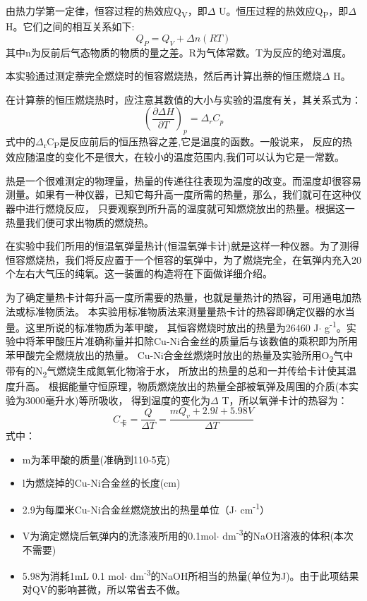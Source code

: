\documentclass[11pt]{report}
\begin{document}
由热力学第一定律，恒容过程的热效应Q\textsubscript{V}，即\(\Delta\) U。恒压过程的热效应Q\textsubscript{P}，即\(\Delta\) H。它们之间的相互关系如下:
\[
    Q_{P}=Q_{V}+\Delta n(RT)
    \]
其中n为反前后气态物质的物质的量之差。R为气体常数。T为反应的绝对温度。

本实验通过测定萘完全燃烧时的恒容燃烧热，然后再计算出萘的恒压燃烧\(\Delta\) H。

在计算萘的恒压燃烧热时，应注意其数值的大小与实验的温度有关，其关系式为：
\[
    \left(\frac{\partial \Delta H}{\partial T}\right)_{p}=\Delta_{r}C_{p}
    \]
式中的\(\Delta\)\textsubscript{r}C\textsubscript{P}是反应前后的恒压热容之差,它是温度的函数。一般说来，
反应的热效应随温度的变化不是很大，在较小的温度范围内,我们可以认为它是一常数。

热是一个很难测定的物理量，热量的传递往往表现为温度的改变。而温度却很容易测量。如果有一种仪器，已知它每升高一度所需的热量，那么，我们就可在这种仪器中进行燃烧反应，
只要观察到所升高的温度就可知燃烧放出的热量。根据这一热量我们便可求出物质的燃烧热。

在实验中我们所用的恒温氧弹量热计(恒温氧弹卡计)就是这样一种仪器。为了测得恒容燃烧热，我们将反应置于一个恒容的氧弹中，为了燃烧完全，在氧弹内充入20个左右大气压的纯氧。这一装置的构造将在下面做详细介绍。

为了确定量热卡计每升高一度所需要的热量，也就是量热计的热容，可用通电加热法或标准物质法。
本实验用标准物质法来测量量热卡计的热容即确定仪器的水当量。这里所说的标准物质为苯甲酸，
其恒容燃烧时放出的热量为26460 J\(\cdot\) g\textsuperscript{-1}。实验中将苯甲酸压片准确称量并扣除Cu-Ni合金丝的质量后与该数值的乘积即为所用苯甲酸完全燃烧放出的热量。
Cu-Ni合金丝燃烧时放出的热量及实验所用O\textsubscript{2}气中带有的N\textsubscript{2}气燃烧生成氮氧化物溶于水，
所放出的热量的总和一并传给卡计使其温度升高。
根据能量守恒原理，物质燃烧放出的热量全部被氧弹及周围的介质(本实验为3000毫升水)等所吸收，
得到温度的变化为\(\Delta\) T，所以氧弹卡计的热容为：
\[
    C_{卡}=\frac{Q}{\Delta T}=\frac{mQ_{v}+2.9l+5.98V}{\Delta T}
    \]
式中：
\begin{itemize}
\item m为苯甲酸的质量(准确到110-5克)
\item l为燃烧掉的Cu-Ni合金丝的长度(cm)
\item 2.9为每厘米Cu-Ni合金丝燃烧放出的热量单位（J\(\cdot\) cm\textsuperscript{-1}）
\item V为滴定燃烧后氧弹内的洗涤液所用的0.1mol\(\cdot\) dm\textsuperscript{-3}的NaOH溶液的体积(本次不需要)
\item 5.98为消耗1mL 0.1 mol\(\cdot\) dm\textsuperscript{-3}的NaOH所相当的热量(单位为J)。由于此项结果对QV的影响甚微，所以常省去不做。
\end{itemize}
\end{document}
